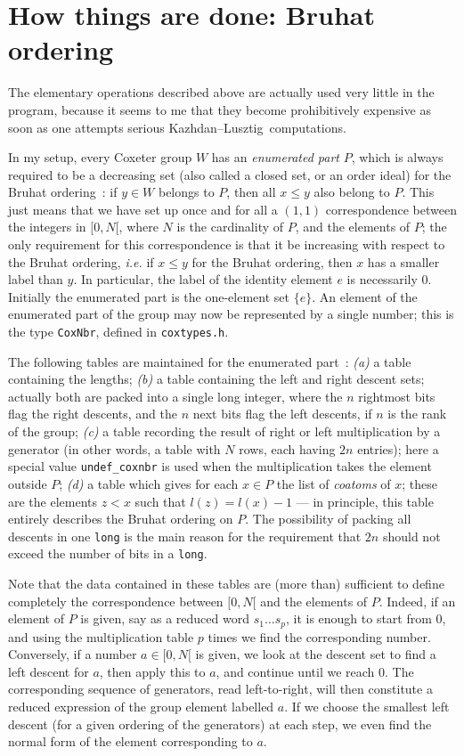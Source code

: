 \documentclass[11pt]{article}
\newcommand{\kl}{Kazh\-dan--Lusz\-tig}
\begin{document}
\section{How things are done: Bruhat ordering}\label{section:bruhat}

The elementary operations described above are actually used very little in
the program, because it seems to me that they become prohibitively expensive
as soon as one attempts serious \kl\ computations.

In my setup, every Coxeter group $W$ has an {\em enumerated part} $P$, which is
always required to be a decreasing set (also called a closed set, or an order
ideal) for the Bruhat ordering~: if $y\in W$ belongs to $P$, then all $x\leq y$
also belong to $P$. This just means that we have set up once and for all
a $(1,1)$ correspondence between the integers in $[0,N[$, where $N$ is the 
cardinality of $P$, and the elements of $P$; the only requirement for this 
correspondence is that it be increasing with respect to the Bruhat ordering, 
{\em i.e.} if $x\leq y$ for the Bruhat ordering, then $x$ has a smaller label
than $y$. In particular, the label of the identity element $e$ is necessarily
$0$. Initially the enumerated part is the one-element set $\{e\}$. An
element of the enumerated part of the group may now be represented by a
single number; this is the type {\tt CoxNbr}, defined in {\tt coxtypes.h}.

The following tables are maintained for the enumerated part~: {\it (a)} a
table containing the lengths; {\it (b)} a table containing the left and
right descent sets; actually both are packed into a single long integer,
where the $n$ rightmost bits flag the right descents, and the $n$ next
bits flag the left descents, if $n$ is the rank of the group;
{\it (c)} a table recording the result of right or left multiplication by
a generator (in other words, a table with $N$ rows, each having $2n$ entries);
here a special value {\tt undef\_coxnbr} is used when the multiplication takes
the element outside $P$; {\it (d)} a table which gives for each $x\in P$ the
list of {\em coatoms} of $x$; these are the elements $z<x$ such that
$l(z)=l(x)-1$ --- in principle, this table entirely describes the Bruhat
ordering on $P$. The possibility of packing all descents in one {\tt long} is 
the main reason for the requirement that $2n$ should not exceed the number of 
bits in a {\tt long}.

Note that the data contained in these tables are (more than) sufficient to
define completely the correspondence between $[0,N[$ and the elements of
$P$. Indeed, if an element of $P$ is given, say as a reduced word 
$s_1\ldots s_p$, it is enough to start from $0$, and using the multiplication 
table $p$ times we find the corresponding number. Conversely, if a number
$a\in[0,N[$ is given, we look at the descent set to find a left descent for 
$a$, then apply this to $a$, and continue until we reach $0$. The corresponding
sequence of generators, read left-to-right, will then constitute a reduced
expression of the group element labelled $a$. If we choose the 
smallest left descent (for a given ordering of the generators) at each step, 
we even find the normal form of the element corresponding to $a$.
\end{document}
